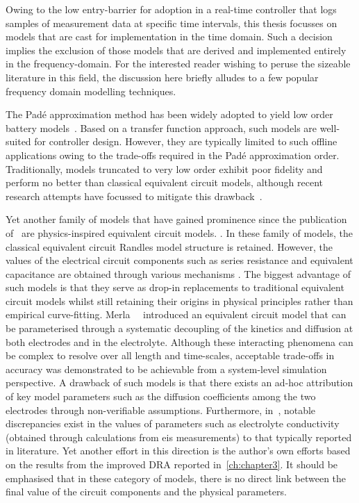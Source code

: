 Owing to the low entry-barrier for adoption in a real-time controller that logs samples of measurement data at specific
time intervals, this thesis focusses on models that are cast for implementation in the time domain. Such a decision
implies the exclusion of those models that are derived and implemented entirely in the frequency-domain. For the
interested reader wishing to peruse the sizeable literature in this field, the discussion here briefly alludes to a few
popular frequency domain modelling techniques.

The Padé approximation method has been widely adopted to yield low order battery models~\cite{Forman2011a}. Based on a transfer function approach, such models are well-suited for controller design.
However, they are typically limited to such offline applications owing to the trade-offs required in the Padé
approximation order. Traditionally, models truncated to very low order exhibit poor fidelity and perform no better than
classical equivalent circuit models, although recent research attempts have focussed to mitigate this
drawback~\cite{Yuan2017a,Yuan2017}.

Yet another family of models that have gained prominence since the publication of~\cite{Jokar2016} are physics-inspired
equivalent circuit models. . In these family of
models, the classical equivalent circuit Randles model structure is retained. However, the values of the electrical
circuit components such as series resistance and equivalent capacitance  are obtained through various mechanisms
. The biggest advantage of such models is that they serve as drop-in replacements to traditional
equivalent circuit models whilst still retaining their origins in physical principles rather than empirical
curve-fitting. Merla~\etal{}~\cite{Merla2018} introduced an equivalent circuit model that can be parameterised through a
systematic decoupling of the kinetics and diffusion at both electrodes and in the electrolyte. Although these
interacting phenomena can be complex to resolve over all length and time-scales, acceptable trade-offs in accuracy was
demonstrated to be achievable from a system-level simulation perspective. A drawback of such models is that there exists
an ad-hoc attribution of key model parameters such as the diffusion coefficients among the two electrodes through
non-verifiable assumptions. Furthermore, in~\cite{Merla2018}, notable discrepancies exist in the values of parameters
such as electrolyte conductivity (obtained through calculations from \gls{eis} measurements) to that typically reported
in literature.  Yet another effort in this direction  is the author's own efforts based on the
results from the improved DRA reported in~\cref{ch:chapter3}. It should be
emphasised that in these category of models, there is no direct link between the final value of the circuit
components and the physical parameters.

